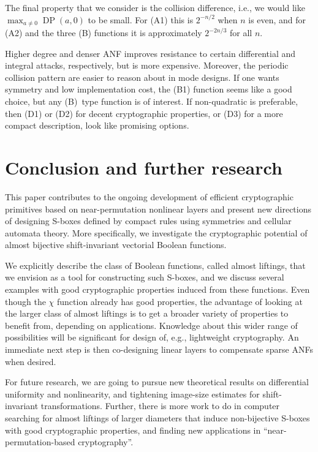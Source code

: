 \documentclass[11pt,english,a4paper]{amsart}
\theoremstyle{plain}
\theoremstyle{definition}
\theoremstyle{remark}
\begin{document}
	The final property that we consider is the collision difference, i.e., we would like $\max_{a\neq 0} \operatorname{DP}(a,0)$ to be small. For (A1) this is $2^{-n/2}$ when $n$ is even, and for (A2) and the three (B) functions it is approximately $2^{-2n/3}$ for all $n$.

\medskip

Higher degree and denser ANF improves resistance to certain differential and integral attacks, respectively, but is more expensive. Moreover, the periodic collision pattern are easier to reason about in mode designs. If one wants symmetry and low implementation cost, the (B1) function seems like a good choice, but any (B)~type function is of interest. If non-quadratic is preferable, then (D1) or (D2) for decent cryptographic properties, or (D3) for a more compact description, look like promising options.


\section{Conclusion and further research}

This paper contributes to the ongoing development of efficient cryptographic primitives based on near-permutation nonlinear layers and present new directions of designing S-boxes defined by compact rules using symmetries and cellular automata theory. More specifically, we investigate the cryptographic potential of almost bijective shift-invariant vectorial Boolean functions. 

We explicitly describe the class of Boolean functions, called almost liftings, that we envision as a tool for constructing such S-boxes, and we discuss several examples with good cryptographic properties induced from these functions. Even though the $\chi$ function already has good properties, the advantage of looking at the larger class of almost liftings is to get a broader variety of properties to benefit from, depending on applications. Knowledge about this wider range of possibilities will be significant for design of, e.g., lightweight cryptography. An immediate next step is then co-designing linear layers to compensate sparse ANFs when desired.

For future research, we are going to pursue new theoretical results on differential uniformity and nonlinearity, and tightening image-size estimates for shift-invariant transformations. Further, there is more work to do in computer searching for almost liftings of larger diameters that induce non-bijective S-boxes with good cryptographic properties, and finding new applications in ``near-permutation-based cryptography''.
\end{document}

